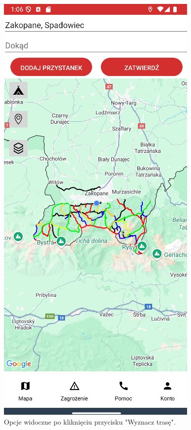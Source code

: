 \begin{figure}[H]
    \centering
    \includegraphics[scale=0.5]{img/imp/widok-loka.png}
    \caption{Opcje widoczne po kliknięciu przycisku "Wyznacz trasę".}
    \label{widok:wyznacztrase}
\end{figure}

